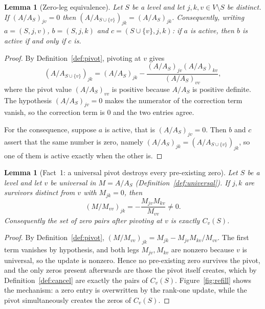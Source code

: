 \documentclass[11pt]{article}
\theoremstyle{plain}
\newtheorem{lemma}[theorem]{Lemma}
\theoremstyle{definition}
\theoremstyle{remark}
\begin{document}
\begin{humanblock}
\begin{lemma}[Zero-leg equivalence]\label{lem:zeroleg}
Let $S$ be a level and let $j,k,v\in V\setminus S$ be distinct. If $(A/A_S)_{jv}=0$ then
$(A/A_{S\cup\{v\}})_{jk}=(A/A_S)_{jk}$. Consequently, writing $a=(S,j,v)$, $b=(S,j,k)$ and
$c=(S\cup\{v\},j,k)$: if $a$ is active, then $b$ is active if and only if $c$ is.
\end{lemma}

\begin{proof}
By Definition~\ref{def:pivot}, pivoting at $v$ gives
\[
  (A/A_{S\cup\{v\}})_{jk}=(A/A_S)_{jk}-\frac{(A/A_S)_{jv}(A/A_S)_{kv}}{(A/A_S)_{vv}},
\]
where the pivot value $(A/A_S)_{vv}$ is positive because $A/A_S$ is positive definite. The hypothesis
$(A/A_S)_{jv}=0$ makes the numerator of the correction term vanish, so the correction term is $0$ and
the two entries agree.

For the consequence, suppose $a$ is active, that is $(A/A_S)_{jv}=0$. Then $b$ and $c$ assert that the
same number is zero, namely $(A/A_S)_{jk}=(A/A_{S\cup\{v\}})_{jk}$, so one of them is active exactly
when the other is.
\end{proof}

\begin{lemma}[Fact~1: a universal pivot destroys every pre-existing zero]\label{lem:fact1}
Let $S$ be a level and let $v$ be universal in $M=A/A_S$ (Definition~\ref{def:universal}). If $j,k$
are survivors distinct from $v$ with $M_{jk}=0$, then
\[(M/M_{vv})_{jk}=-\frac{M_{jv}M_{kv}}{M_{vv}}\neq0.\]
Consequently the set of zero pairs after pivoting at $v$ is exactly $C_v(S)$.
\end{lemma}

\begin{proof}
By Definition~\ref{def:pivot}, $(M/M_{vv})_{jk}=M_{jk}-M_{jv}M_{kv}/M_{vv}$. The first term vanishes
by hypothesis, and both legs $M_{jv},M_{kv}$ are nonzero because $v$ is universal, so the update is
nonzero. Hence no pre-existing zero survives the pivot, and the only zeros present afterwards are
those the pivot itself creates, which by Definition~\ref{def:cancel} are exactly the pairs of
$C_v(S)$. Figure~\ref{fig:refill} shows the mechanism: a zero entry is overwritten by the rank-one
update, while the pivot simultaneously creates the zeros of $C_v(S)$.
\end{proof}
\end{humanblock}
\end{document}
